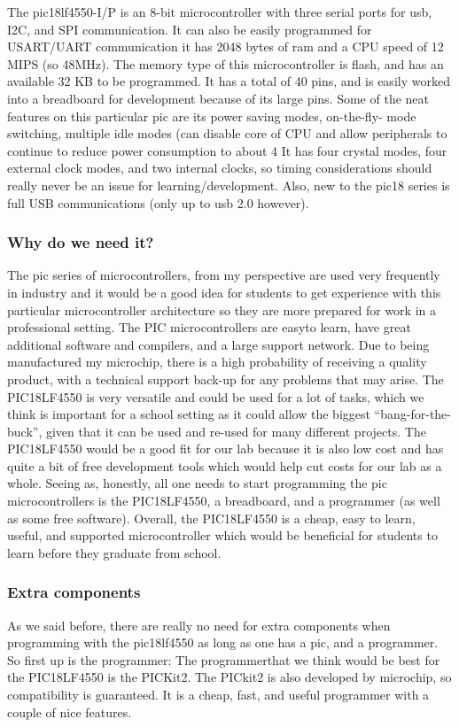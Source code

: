 \documentclass[12pt]{article}
\begin{document}
The pic18lf4550-I/P is an 8-bit microcontroller with three serial ports for usb, I2C, and SPI
communication. It can also be easily programmed for USART/UART communication it has 2048
bytes of ram and a CPU speed of 12 MIPS (so 48MHz). The memory type of this microcontroller
is flash, and has an available 32 KB to be programmed. It has a total of 40 pins, and is easily
worked into a breadboard for development because of its large pins.
Some of the neat features on this particular pic are its power saving modes, on-the-fly- mode
switching, multiple idle modes (can disable core of CPU and allow peripherals to continue to reduce
power consumption to about 4%
It has four crystal modes, four external clock modes, and two internal clocks, so timing
considerations should really never be an issue for learning/development.
Also, new to the pic18 series is full USB communications (only up to usb 2.0 however).

\subsubsection{Why do we need it?}

The pic series of microcontrollers, from my perspective are used very frequently in industry and it
would be a good idea for students to get experience with this particular microcontroller architecture
so they are more prepared for work in a professional setting. The PIC microcontrollers are easyto learn, have great additional software and compilers, and a large support network. Due to being
manufactured my microchip, there is a high probability of receiving a quality product, with a
technical support back-up for any problems that may arise.
The PIC18LF4550 is very versatile and could be used for a lot of tasks, which we think is important
for a school setting as it could allow the biggest “bang-for-the-buck”, given that it can be used and
re-used for many different projects. The PIC18LF4550 would be a good fit for our lab because it
is also low cost and has quite a bit of free development tools which would help cut costs for our lab
as a whole. Seeing as, honestly, all one needs to start programming the pic microcontrollers is the
PIC18LF4550, a breadboard, and a programmer (as well as some free software).
Overall, the PIC18LF4550 is a cheap, easy to learn, useful, and supported microcontroller which
would be beneficial for students to learn before they graduate from school.
\subsubsection{Extra components}
As we said before, there are really no need for extra components when programming with the
pic18lf4550 as long as one has a pic, and a programmer.
So first up is the programmer:
The programmerthat we think would be best for the PIC18LF4550 is the PICKit2.
The PICkit2 is also developed by microchip, so compatibility is guaranteed. It is a cheap, fast, and
useful programmer with a couple of nice features.
\end{document}
